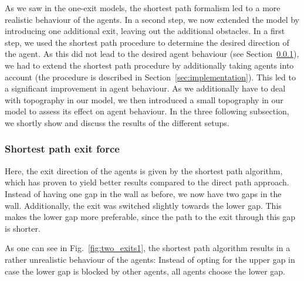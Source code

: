 \documentclass[11pt]{article}
\begin{document}
As we saw in the one-exit models, the shortest path formalism led to a more realistic behaviour of the agents. In a second step, we now extended the model by introducing one additional exit, leaving out the additional obstacles. In a first step, we used the shortest path procedure to determine the desired direction of the agent. As this did not lead to the desired agent behaviour (see Section~\ref{sec:two_exits1}), we had to extend the shortest path procedure by additionally taking agents into account (the procedure is described in Section~\ref{sec:implementation}). This led to a significant improvement in agent behaviour. As we additionally have to deal with topography in our model, we then introduced a small topography in our model to assess its effect on agent behaviour. In the three following subsection, we shortly show and discuss the results of the different setups.

\subsubsection{Shortest path exit force}\label{sec:two_exits1}

Here, the exit direction of the agents is given by the shortest path algorithm, which has proven to yield better results compared to the direct path approach. Instead of having one gap in the wall as before, we now have two gaps in the wall. Additionally, the exit was switched slightly towards the lower gap. This makes the lower gap more preferable, since the path to the exit through this gap is shorter.

As one can see in Fig.~\ref{fig:two_exits1}, the shortest path algorithm results in a rather unrealistic behaviour of the agents: Instead of opting for the upper gap in case the lower gap is blocked by other agents, all agents choose the lower gap.
\end{document}
